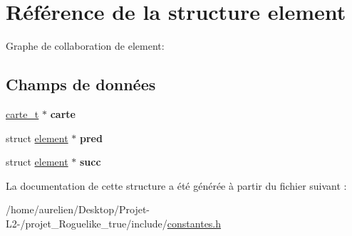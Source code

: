 \hypertarget{structelement}{}\section{Référence de la structure element}
\label{structelement}


Graphe de collaboration de element\+:
\subsection*{Champs de données}
\begin{DoxyCompactItemize}
\item 
\mbox{\label{structelement_a87516f31303f77028d0aa5a4d69214b6}} 
\hyperlink{structcarte__t}{carte\+\_\+t} $\ast$ {\bfseries carte}
\item 
\mbox{\label{structelement_a9f9ebee1fa1dce6d05bc325a66478635}} 
struct \hyperlink{structelement}{element} $\ast$ {\bfseries pred}
\item 
\mbox{\label{structelement_abe10f441a14a96bd130a004585b475ad}} 
struct \hyperlink{structelement}{element} $\ast$ {\bfseries succ}
\end{DoxyCompactItemize}


La documentation de cette structure a été générée à partir du fichier suivant \+:\begin{DoxyCompactItemize}
\item 
/home/aurelien/\+Desktop/\+Projet-\/\+L2-\//projet\+\_\+\+Roguelike\+\_\+true/include/\hyperlink{constantes_8h}{constantes.\+h}\end{DoxyCompactItemize}
